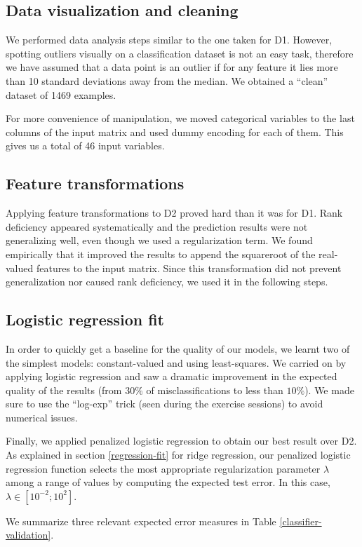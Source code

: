 \documentclass{article} %
\begin{document}
  \subsection{Data visualization and cleaning}
  We performed data analysis steps similar to the one taken for D1. However, spotting outliers visually on a classification dataset is not an easy task, therefore we have assumed that a data point is an outlier if for any feature it lies more than 10 standard deviations away from the median. We obtained a ``clean'' dataset of 1469 examples.

  For more convenience of manipulation, we moved categorical variables to the last columns of the input matrix and used dummy encoding for each of them. This gives us a total of 46 input variables.

  \subsection{Feature transformations}
  Applying feature transformations to D2 proved hard than it was for D1. Rank deficiency appeared systematically and the prediction results were not generalizing well, even though we used a regularization term. We found empirically that it improved the results to append the squareroot of the real-valued features to the input matrix. Since this transformation did not prevent generalization nor caused rank deficiency, we used it in the following steps.

  \subsection{Logistic regression fit}
  In order to quickly get a baseline for the quality of our models, we learnt two of the simplest models: constant-valued and using least-squares. We carried on by applying logistic regression and saw a dramatic improvement in the expected quality of the results (from $30\%$ of misclassifications to less than $10\%$). We made sure to use the ``log-exp'' trick (seen during the exercise sessions) to avoid numerical issues.

  Finally, we applied penalized logistic regression to obtain our best result over D2. As explained in section \ref{regression-fit} for ridge regression, our penalized logistic regression function selects the most appropriate regularization parameter $\lambda$ among a range of values by computing the expected test error. In this case, $\lambda \in [10^{-2}; 10^2]$.

  We summarize three relevant expected error measures in Table \ref{classifier-validation}.
\end{document}
